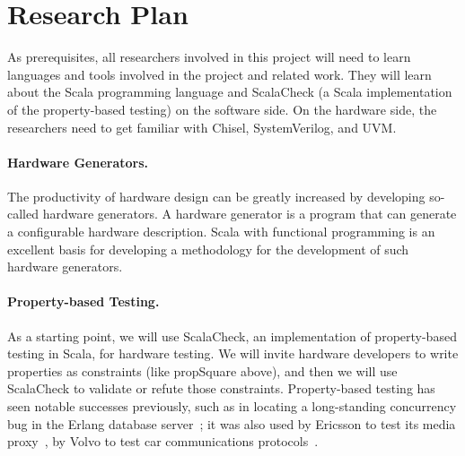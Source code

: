 \documentclass[fleqn,12pt]{article}
\begin{document}
\section{Research Plan}


As prerequisites, all researchers involved in this project will need to learn
languages and tools involved in the project and related work.
They will learn about the Scala programming language and ScalaCheck
(a Scala implementation of the property-based testing) on the software side.
On the hardware side,
the researchers need to get familiar with Chisel, SystemVerilog, and
UVM.


\paragraph{Hardware Generators.}

The productivity of hardware design can be greatly increased by developing so-called
hardware generators. A hardware generator is a program that can generate a configurable
hardware description.
Scala with functional programming is an excellent basis for developing a methodology for the
development of such hardware generators.


\paragraph{Property-based Testing.}
As a starting point, we will use ScalaCheck, an implementation of
property-based testing in Scala, for hardware testing. We will invite
hardware developers to write properties as constraints (like
propSquare above), and then we will use ScalaCheck to validate or
refute those constraints. Property-based testing has seen notable
successes previously, such as in locating a long-standing concurrency
bug in the Erlang database server~\cite{DBLP:conf/erlang/HughesB11};
it was also used by Ericsson to test its media
proxy~\cite{DBLP:conf/erlang/ArtsHJW06}, by Volvo to test car
communications protocols~\cite{DBLP:conf/icst/ArtsHNS15}.
\end{document}
